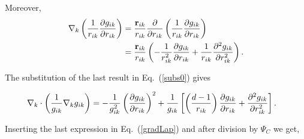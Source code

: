 Moreover, 
\begin{align*}
{\bf \nabla}_k \left(\frac{1}{r_{ik}}\frac{\partial g_{ik}}{\partial r_{ik}}\right) &= \frac{{\bf r}_{ik}}{r_{ik}} \frac{\partial }{\partial r_{ik}} \left(\frac{1}{r_{ik}}\frac{\partial g_{ik}}{\partial r_{ik}}\right)\nonumber\\
&=\frac{{\bf r}_{ik}}{r_{ik}}\left(-\frac{1}{r_{ik}^2}\frac{\partial g_{ik}}{\partial r_{ik}} + \frac{1}{r_{ik}}\frac{\partial^2 g_{ik}}{\partial r_{ik}^2}\right).\label{subs1}
\end{align*}

The substitution of the last result in Eq.~(\ref{subs0}) gives

\begin{align*}
  {\bf \nabla}_k \cdot \left(\frac{1}{g_{ik}}{\bf \nabla}_k g_{ik}\right) &= -\frac{1}{g_{ik}^2}\left(\frac{\partial g_{ik}}{\partial r_{ik}}\right)^2 + \frac{1}{g_{ik}}\left[\left(\frac{d-1}{r_{ik}}\right)\frac{\partial g_{ik}}{\partial r_{ik}} + \frac{\partial^2 g_{ik}}{\partial r_{ik}^2} \right].
\end{align*}

Inserting the last expression in Eq.~(\ref{gradLap}) and after division by $\Psi_C$ we get,

